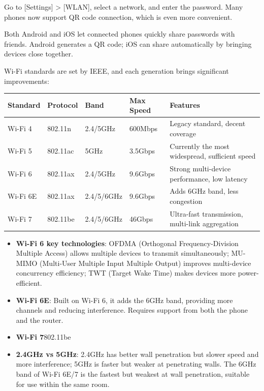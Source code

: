 Go to [Settings] > [WLAN], select a network, and enter the password. Many phones now support QR code connection, which is even more convenient.


Both Android and iOS let connected phones quickly share passwords with friends. Android generates a QR code; iOS can share automatically by bringing devices close together.


Wi-Fi standards are set by IEEE, and each generation brings significant improvements:

\begin{center}
\begin{tabularx}{\linewidth}{|X|X|X|X|X|}
\hline
\textbf{Standard} & \textbf{Protocol} & \textbf{Band} & \textbf{Max Speed} & \textbf{Features} \tabularnewline
\hline
Wi-Fi 4 & 802.11n & 2.4/5GHz & 600Mbps & Legacy standard, decent coverage \tabularnewline
Wi-Fi 5 & 802.11ac & 5GHz & 3.5Gbps & Currently the most widespread, sufficient speed \tabularnewline
Wi-Fi 6 & 802.11ax & 2.4/5GHz & 9.6Gbps & Strong multi-device performance, low latency \tabularnewline
Wi-Fi 6E & 802.11ax & 2.4/5/6GHz & 9.6Gbps & Adds 6GHz band, less congestion \tabularnewline
Wi-Fi 7 & 802.11be & 2.4/5/6GHz & 46Gbps & Ultra-fast transmission, multi-link aggregation \tabularnewline
\hline
\end{tabularx}
\end{center}

\begin{itemize}
  \item \textbf{Wi-Fi 6 key technologies}: OFDMA (Orthogonal Frequency-Division Multiple Access) allows multiple devices to transmit simultaneously; MU-MIMO (Multi-User Multiple Input Multiple Output) improves multi-device concurrency efficiency; TWT (Target Wake Time) makes devices more power-efficient.
  \item \textbf{Wi-Fi 6E}: Built on Wi-Fi 6, it adds the 6GHz band, providing more channels and reducing interference. Requires support from both the phone and the router.
  \item \textbf{Wi-Fi 7}802.11be
  \item \textbf{2.4GHz vs 5GHz}: 2.4GHz has better wall penetration but slower speed and more interference; 5GHz is faster but weaker at penetrating walls. The 6GHz band of Wi-Fi 6E/7 is the fastest but weakest at wall penetration, suitable for use within the same room.
\end{itemize}


